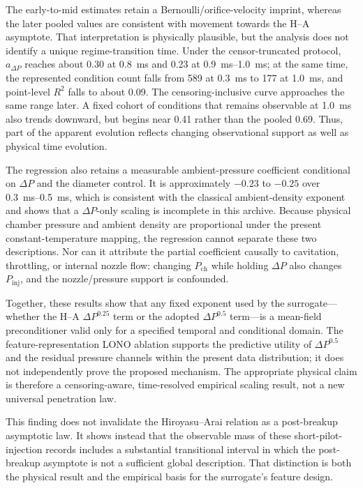 The early-to-mid estimates retain a Bernoulli/orifice-velocity imprint, whereas the later pooled values are consistent with movement towards the H--A asymptote. That interpretation is physically plausible, but the analysis does not identify a unique regime-transition time. Under the censor-truncated protocol, \(a_{\Delta P}\) reaches about 0.30 at \SI{0.8}{ms} and 0.23 at \SIrange{0.9}{1.0}{ms}; at the same time, the represented condition count falls from 589 at \SI{0.3}{ms} to 177 at \SI{1.0}{ms}, and point-level \(R^2\) falls to about 0.09. The censoring-inclusive curve approaches the same range later. A fixed cohort of conditions that remains observable at \SI{1.0}{ms} also trends downward, but begins near 0.41 rather than the pooled 0.69. Thus, part of the apparent evolution reflects changing observational support as well as physical time evolution.

The regression also retains a measurable ambient-pressure coefficient conditional on \(\Delta P\) and the diameter control. It is approximately \(-0.23\) to \(-0.25\) over \SIrange{0.3}{0.5}{ms}, which is consistent with the classical ambient-density exponent and shows that a \(\Delta P\)-only scaling is incomplete in this archive. Because physical chamber pressure and ambient density are proportional under the present constant-temperature mapping, the regression cannot separate these two descriptions. Nor can it attribute the partial coefficient causally to cavitation, throttling, or internal nozzle flow: changing \(P_\mathrm{ch}\) while holding \(\Delta P\) also changes \(P_\mathrm{inj}\), and the nozzle/pressure support is confounded.

Together, these results show that any fixed exponent used by the surrogate---whether the H--A \(\Delta P^{0.25}\) term or the adopted \(\Delta P^{0.5}\) term---is a mean-field preconditioner valid only for a specified temporal and conditional domain. The feature-representation LONO ablation supports the predictive utility of \(\Delta P^{0.5}\) and the residual pressure channels within the present data distribution; it does not independently prove the proposed mechanism. The appropriate physical claim is therefore a censoring-aware, time-resolved empirical scaling result, not a new universal penetration law.

This finding does not invalidate the Hiroyasu--Arai relation as a post-breakup asymptotic law. It shows instead that the observable mass of these short-pilot-injection records includes a substantial transitional interval in which the post-breakup asymptote is not a sufficient global description. That distinction is both the physical result and the empirical basis for the surrogate's feature design.

